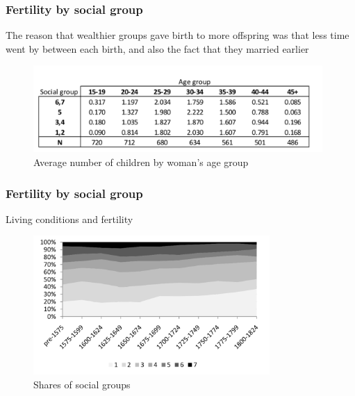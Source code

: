 \documentclass[pdftex,12pt,xcolor=pdftex,table]{beamer}
\begin{document}
\begin{frame}
\frametitle{Fertility by social group}
The reason that wealthier groups gave birth to more offspring was that less time went by between each birth, and also the fact that they married earlier
\begin{figure}[h!]
    \raggedright   
    \centering
    \includegraphics[width=11cm]{table6.png}
    \caption{Average number of children 
    by woman’s age group}
 \end{figure}
\end{frame}
\begin{frame}
\frametitle{Fertility by social group}
Living conditions and fertility 
\begin{figure}[h!]
    \centering
    \includegraphics[width=9cm]{figure8.png}
    \caption{Shares of social groups}
 \end{figure}
\end{frame}
\end{document}
